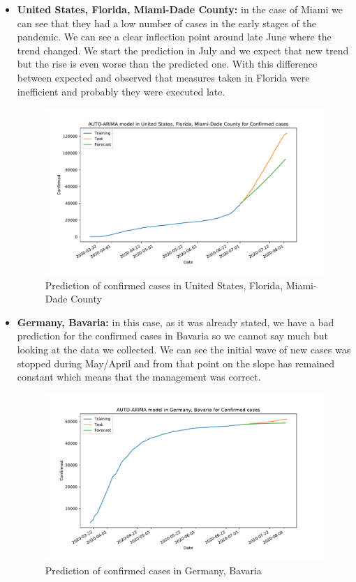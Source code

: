 \documentclass[lang=english,inputenc=utf8,fontsize=10pt]{ldvarticle}
\begin{document}
\begin{itemize}
    \item 
    \textbf{United States, Florida, Miami-Dade County:} in the case of Miami we can see that they had a low number of cases in the early stages of the pandemic. We can see a clear inflection point around late June where the trend changed. We start the prediction in July and we expect that new trend but the rise is even worse than the predicted one. With this difference between expected and observed that measures taken in Florida were inefficient and probably they were executed late\cite{nbc_miami_2020}.
    \begin{figure}[H]
        \centering
        \includegraphics[scale=0.4]{plots/United_States_Florida_Miami-Dade_County_Confirmed_prediction.pdf}
        \caption{Prediction of confirmed cases in United States, Florida, Miami-Dade County}
    \end{figure}
    
    \item
    \textbf{Germany, Bavaria:} in this case, as it was already stated, we have a bad prediction for the confirmed cases in Bavaria so we cannot say much but looking at the data we collected. 	We can see the initial wave of new cases was stopped during May/April and from that point on the slope has remained constant which means that the management was correct.
    \begin{figure}[H]
        \centering
        \includegraphics[scale=0.4]{plots/Germany_Bavaria_Confirmed_prediction.pdf}
        \caption{Prediction of confirmed cases in Germany, Bavaria}
    \end{figure}
    

\end{itemize}
\end{document}
